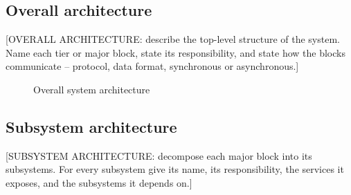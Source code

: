 \subsection{Overall architecture}
\label{subsec:arch-overall}

[OVERALL ARCHITECTURE: describe the top-level structure of the system.
Name each tier or major block, state its responsibility, and state how
the blocks communicate -- protocol, data format, synchronous or
asynchronous.]

\begin{figure}[H]
  \centering
  \caption{Overall system architecture}
  \label{fig:system-architecture}
\end{figure}

\subsection{Subsystem architecture}
\label{subsec:arch-subsystem}

[SUBSYSTEM ARCHITECTURE: decompose each major block into its
subsystems. For every subsystem give its name, its responsibility, the
services it exposes, and the subsystems it depends on.]

